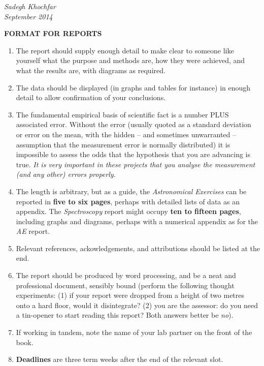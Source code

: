 \documentclass[12pt]{article}
\begin{document}
\vspace*{2mm}
{\sl Sadegh Khochfar\\
September 2014}



\newpage

\begin{center}
{\bf FORMAT FOR REPORTS}
\end{center}
\begin{enumerate}
\item The report should supply enough detail to make clear to someone like yourself what the purpose and methods are, how they were achieved, and what the results are, with diagrams as required. 

\item The data should be displayed (in graphs and tables for instance) in enough detail to allow confirmation of your conclusions.

\item The fundamental empirical basis of scientific fact is a number PLUS associated error. Without the error (usually quoted as a standard deviation or error on the mean, with the hidden -- and sometimes unwarranted -- assumption that the measurement error is normally distributed) it is impossible to assess the odds that the hypothesis that you are advancing is true. {\sl It is very important in these projects that you analyse the measurement (and any other) errors properly.}

\item The length is arbitrary, but as a guide, the {\sl Astronomical Exercises} can be reported in {\bf five to six pages}, perhaps with detailed lists of data as an appendix. The {\sl Spectroscopy} report might occupy {\bf ten to fifteen pages}, including graphs and diagrams, perhaps with a numerical appendix as for the {\sl AE} report.

\item Relevant references, ackowledgements, and attributions should be listed at the end.

\item The report should be produced by word processing, and be a neat and professional document, sensibly bound (perform the following thought experiments: (1) if your report were dropped from a height of two metres onto a hard floor, would it disintegrate? (2) you are the assessor: do you need a tin-opener to start reading this report? Both answers better be {\sl no}).

\item If working in tandem, note the name of your lab partner on the front of the book.

\item {\bf Deadlines} are three term weeks after the end of the relevant slot.

\end{enumerate}
\end{document}
